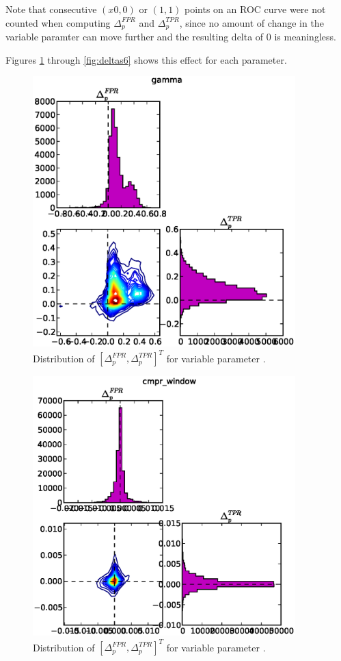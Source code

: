 Note that consecutive $(x0,0)$ or $(1,1)$ points on an ROC curve were not
counted when computing $\Delta_p^{FPR}$ and $\Delta_p^{TPR}$, since no amount of
change in the variable paramter can move further and the resulting delta of 0 is
meaningless.

Figures \ref{fig:deltas1} through \ref{fig:deltas6} shows this effect for each parameter.

\clearpage

\begin{figure}[!h]
\begin{center}
\includegraphics[width=4in]{../fig/final/delta_hist/gamma}
\end{center}
\caption{\label{fig:deltas1}  Distribution of $[\Delta_p^{FPR},\Delta_p^{TPR}]^T$
  for variable parameter .}
\end{figure}

\begin{figure}[!h]
\begin{center}
\includegraphics[width=4in]{../fig/final/delta_hist/cmpr_window}
\end{center}
\caption{\label{fig:deltas2}  Distribution of $[\Delta_p^{FPR},\Delta_p^{TPR}]^T$
  for variable parameter . }
\end{figure}

